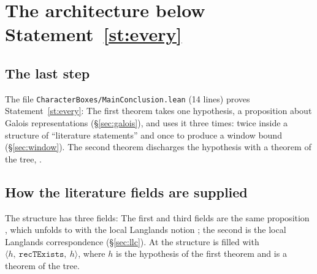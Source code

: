 \section{The architecture below Statement~\ref{st:every}}\label{sec:architecture}

\subsection{The last step}

The file \texttt{CharacterBoxes/MainConclusion.lean} (14 lines) proves Statement~\ref{st:every}:
\noindent The first theorem takes one hypothesis, a proposition 
about Galois representations (\S\ref{sec:galois}), and uses it three times: twice inside a structure
of ``literature statements'' and once to produce a window bound 
(\S\ref{sec:window}). The second theorem discharges the hypothesis with a theorem of the tree,
.

\subsection{How the literature fields are supplied}

The structure has three fields:
\noindent The first and third fields are the same proposition , which
unfolds to  with the local Langlands notion 
;
the second is the local Langlands correspondence 
(\S\ref{sec:llc}). At 
the structure is filled with $\langle h,\ \texttt{recTExists},\ h\rangle$, where $h$ is the
hypothesis of the first theorem and  is a theorem of the tree.

